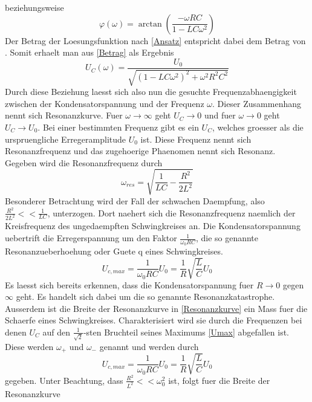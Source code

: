\documentclass[titlepage=firstcover, captions=tableheading]{scrartcl}
\begin{document}
beziehungsweise
\begin{equation}\label{phi}
    \varphi(\omega)=\arctan(\frac{-\omega RC}{1-LC\omega^2})
\end{equation}
Der Betrag der Loesungsfunktion nach \ref{Ansatz} entspricht dabei dem Betrag von \xi. Somit erhaelt man aus \ref{Betrag} als Ergebnis
\begin{equation} \label{Resonanzkurve}
    U_C(\omega)=\frac{U_0}{\sqrt{(1-LC\omega^2)^2+\omega^2R^2C^2}}
\end{equation}
Durch diese Beziehung laesst sich also nun die gesuchte Frequenzabhaengigkeit zwischen der Kondensatorspannung und der Frequenz $\omega$. Dieser Zusammenhang nennt sich Resonanzkurve. Fuer $\omega\rightarrow\infty$ geht $U_C\rightarrow 0$ und fuer $\omega\rightarrow 0$ geht $U_C\rightarrow U_0$. Bei einer bestimmten Frequenz gibt es ein $U_C$, welches groesser als die urspruengliche Erregeramplitude $U_0$ ist. Diese Frequenz nennt sich Resonanzfrequenz und das zugehoerige Phaenomen nennt sich Resonanz. Gegeben wird die Resonanzfrequenz durch
\begin{equation}
    \omega_{res}=\sqrt{\frac{1}{LC}-\frac{R^2}{2L^2}} \nonumber
\end{equation}
Besonderer Betrachtung wird der Fall der schwachen Daempfung, also $\frac{R^2}{2L^2}<<\frac{1}{LC}$, unterzogen. Dort naehert sich die Resonanzfrequenz naemlich der Kreisfrequenz des ungedaempften Schwingkreises an. Die Kondensatorspannung uebertrift die Erregerspannung um den Faktor $\frac{1}{\omega_0RC}$, die so genannte Resonanzueberhoehung oder Guete q eines Schwingkreises.
\begin{equation}\label{Umax}
    U_{c,max}=\frac{1}{\omega_0RC}U_0=\frac{1}{R}\sqrt{\frac{L}{C}}U_0 
\end{equation}
Es laesst sich bereits erkennen, dass die Kondensatorspannung fuer $R\rightarrow 0$ gegen $\infty$ geht. Es handelt sich dabei um die so genannte Resonanzkatastrophe. Ausserdem ist die Breite der Resonanzkurve in \ref{Resonanzkurve} ein Mass fuer die Schaerfe eines Schwingkreises. Charakterisiert wird sie durch die Frequenzen bei denen $U_C$ auf den $\frac{1}{\sqrt{2}}$-sten Bruchteil seines Maximums \ref{Umax} abgefallen ist. Diese werden $\omega_+$ und $\omega_-$ genannt und werden durch 
\begin{equation}
    U_{c,max}=\frac{1}{\omega_0RC}U_0=\frac{1}{R}\sqrt{\frac{L}{C}}U_0 \nonumber
\end{equation}
gegeben. Unter Beachtung, dass $\frac{R^2}{L^2}<<\omega_0^2$ ist, folgt fuer die Breite der Resonanzkurve
\end{document}
